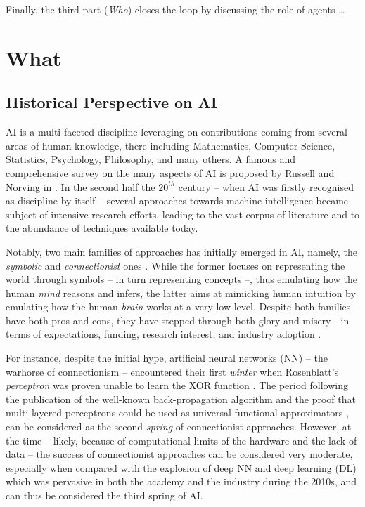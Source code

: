 \documentclass[12pt,a4paper,openright,twoside]{book}
\begin{document}
Finally, the third part (\emph{Who}) closes the loop by discussing the role of agents \ldots
{}


\part{What}
\label{part:what}

\chapter{Historical Perspective on AI}

AI is a multi-faceted discipline leveraging on contributions coming from several areas of human knowledge, there including Mathematics, Computer Science, Statistics, Psychology, Philosophy, and many others.
%
A famous and comprehensive survey on the many aspects of AI is proposed by Russell and Norving in \cite{russell2016artificial}.
%
In the second half the $20^{th}$ century -- when AI was firstly recognised as discipline by itself -- several approaches towards machine intelligence became subject of intensive research efforts, leading to the vast corpus of literature and to the abundance of techniques available today.

Notably, two main families of approaches has initially emerged in AI, namely, the \emph{symbolic} and \emph{connectionist} ones \cite{Smolensky1987, SUN2001783}.
%
While the former focuses on representing the world through symbols -- in turn representing concepts --, thus emulating how the human \emph{mind} reasons and infers, the latter aims at mimicking human intuition by emulating how the human \emph{brain} works at a very low level.
%
Despite both families have both pros and cons, they have stepped through both glory and misery---in terms of expectations, funding, research interest, and industry adoption \cite{Hendler2008, russell2016artificial}.

For instance, despite the initial hype, artificial neural networks (NN) -- the warhorse of connectionism -- encountered their first \emph{winter} when Rosenblatt's \emph{perceptron} \cite{rosenblatt1957perceptron} was proven unable to learn the XOR function \cite{Minsky1988}.
%
The period following the publication of the well-known back-propagation algorithm \cite{Rumelhart1986} and the proof that multi-layered perceptrons could be used as universal functional approximators \cite{Cybenko1989}, can be considered as the second \emph{spring} of connectionist approaches.
%
However, at the time -- likely, because of computational limits of the hardware and the lack of data -- the success of connectionist approaches can be considered very moderate, especially when compared with the explosion of deep NN and deep learning (DL) \cite{GoodfellowBC2016} which was pervasive in both the academy and the industry during the 2010s, and can thus be considered the third spring of AI.
\end{document}
